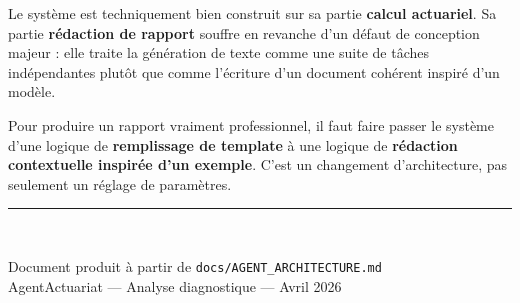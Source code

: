 \documentclass[12pt,a4paper]{article}
\begin{document}
\bigskip

\begin{diagbox}[Conclusion]
Le système est techniquement bien construit sur sa partie \textbf{calcul actuariel}.
Sa partie \textbf{rédaction de rapport} souffre en revanche d'un défaut de conception
majeur : elle traite la génération de texte comme une suite de tâches indépendantes
plutôt que comme l'écriture d'un document cohérent inspiré d'un modèle.

\medskip
Pour produire un rapport vraiment professionnel, il faut faire passer le système
d'une logique de \textbf{remplissage de template} à une logique de \textbf{rédaction
contextuelle inspirée d'un exemple}. C'est un changement d'architecture, pas
seulement un réglage de paramètres.
\end{diagbox}

\vfill
\begin{center}
\rule{0.5\linewidth}{0.4pt}\\[4pt]
{\footnotesize\color{gray}
Document produit à partir de \texttt{docs/AGENT\_ARCHITECTURE.md}\\
AgentActuariat — Analyse diagnostique — Avril 2026\par}
\end{center}
\end{document}
